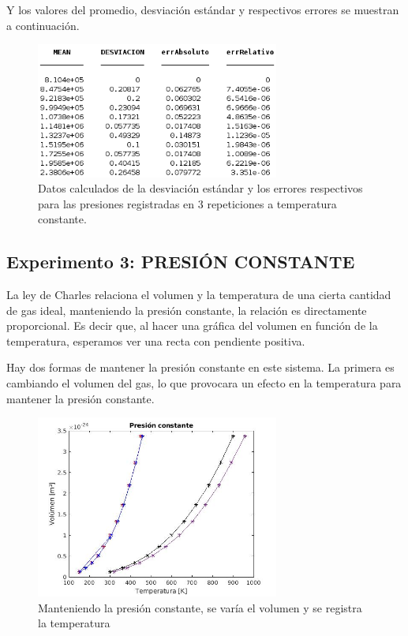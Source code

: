 \documentclass[journal,transmag]{IEEEtran}
\begin{document}
Y los valores del promedio, desviación estándar y respectivos errores se muestran a continuación.
\begin{figure}[!h]
				\center
				\includegraphics[width=8cm]{img/t4.png}
				\caption{Datos calculados de la desviación estándar y los errores respectivos para las presiones registradas en 3 repeticiones a temperatura constante.}
				\label{f19}
	\end{figure}

\subsection{Experimento 3: PRESIÓN CONSTANTE }

La ley de Charles relaciona el volumen y la temperatura de una cierta cantidad de gas ideal, manteniendo la presión constante, la relación es directamente proporcional. Es decir que, al hacer una gráfica del volumen en función de la temperatura, esperamos ver una recta con pendiente positiva. 

Hay dos formas de mantener la presión constante en este sistema. La primera es cambiando el volumen del gas, lo que provocara un efecto en la temperatura para mantener la presión constante. 

\begin{figure}[!h]
				\center
				\includegraphics[width=8cm]{img/precte1.jpg}
				\caption{Manteniendo la presión constante, se varía el volumen y se registra la temperatura}
				\label{f20}
	\end{figure}
	
\end{document}
